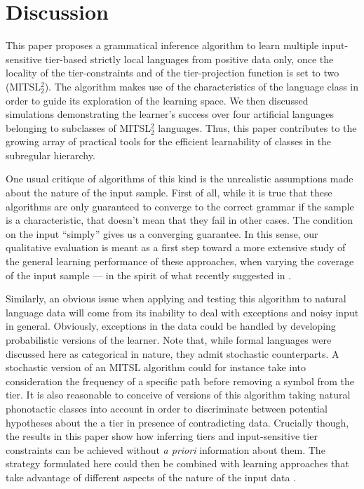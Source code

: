 \documentclass[11pt,a4paper]{article}
\begin{document}
\section{Discussion}

 This paper proposes a grammatical  inference algorithm to learn multiple input-sensitive tier-based strictly local languages \citep[MITSL;][]{desanto2019structure} from positive data only, once the locality of the tier-constraints and of the tier-projection function is set to two (MITSL$^2_2$).
The algorithm makes use of the characteristics of the language class in order to guide its exploration of the learning space.
We then discussed simulations demonstrating the learner's success over four artificial languages belonging to subclasses of MITSL$^2_2$ languages.
Thus, this paper contributes to the growing array of practical tools for the efficient learnability of classes in the subregular hierarchy.

One usual critique of algorithms of this kind is the unrealistic assumptions made about the nature of the input sample.
First of all, while it is true that these algorithms are only guaranteed to converge to the correct grammar if the sample is a characteristic, that doesn't mean that they fail in other cases.
The condition on the input ``simply''  gives us a converging guarantee.
In this sense, our qualitative evaluation is meant as a first step toward a more extensive study of the general learning performance of these approaches, when varying the coverage of the input sample ---  in the spirit of what recently suggested in \citep{aksenova2020tool}.


Similarly, an obvious issue when applying and testing this algorithm to natural language data will come from its inability to deal with exceptions and noisy input in general.
Obviously, exceptions in the data could be handled by developing probabilistic versions of the learner. 
Note that, while formal languages were discussed here as categorical in nature, they admit stochastic counterparts.
A stochastic version of an MITSL algorithm could for instance take into consideration the frequency of a specific path before removing a symbol from the tier.
It is also reasonable to conceive of versions of this algorithm taking natural phonotactic classes into account in order to discriminate between potential hypotheses about the a tier in presence of contradicting data.
Crucially though, the results in this paper show how inferring tiers and input-sensitive tier constraints can be achieved without \emph{a priori} information about them.
The strategy formulated here could then be combined with learning approaches that take advantage of different aspects of the nature of the input data \cite{gouskova2020inducing,rasin2019simultaneous}.
\end{document}
